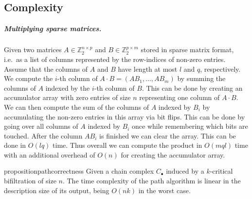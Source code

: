 \documentclass[11pt]{article}
\begin{document}
\subsection{Complexity}
\label{app:path_complexity}
%
\subparagraph{Multiplying sparse matrices.} Given two matrices $A\in\mathbb{Z}_2^{n\times p}$ and $B\in\mathbb{Z}_2^{p\times m}$ stored in sparse matrix format, i.e.\ as a list of columns represented by the row-indices of non-zero entries. Assume that the columns of $A$ and $B$ have length at most $l$ and $q$, respectively. We compute the $i$-th column of $A\cdot B=(AB_1,\ldots,AB_m)$ by summing the columns of $A$ indexed by the $i$-th column of $B$. This can be done by creating an accumulator array with zero entries of size $n$ representing one column of $A\cdot B$. We can then compute the sum of the columns of $A$ indexed by $B_i$ by accumulating the non-zero entries in this array via bit flips. This can be done by going over all columns of $A$ indexed by $B_i$ once while remembering which bits are touched. After the column $AB_i$ is finished we can clear the array. This can be done in $O(lq)$ time. Thus overall we can compute the product in $O(mql)$ time with an additional overhead of $O(n)$ for creating the accumulator array.
%
%
%
%
%
\begin{restatable}{proposition}{pathcorrectness}
\label{prop:path_complexity}
Given a chain complex $C_\bullet$ induced by a $k$-critical bifiltration of size $n$. The time complexity of the path algorithm is linear in the description size of its output, being $O(nk)$ in the worst case. 
\end{restatable}
\end{document}
